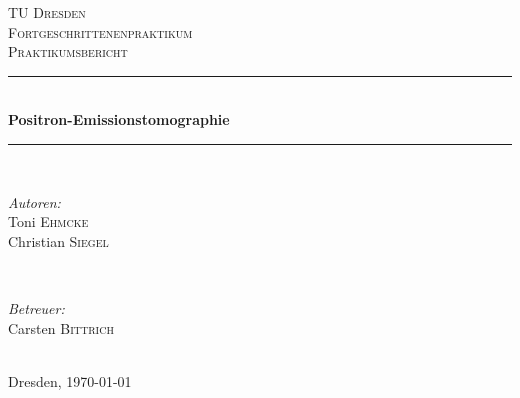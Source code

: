 \begin{titlepage}
\newcommand{\HRule}{\rule{\linewidth}{0.5mm}} %

\center %
 

\textsc{\LARGE TU Dresden}\\[1.5cm] %
\textsc{\Large Fortgeschrittenenpraktikum}\\[0.5cm] %
\textsc{\Large Praktikumsbericht}\\[0.5cm] %


\HRule \\[0.7cm]
{ \huge \bfseries Positron-Emissionstomographie}\\[0.4cm] %
\HRule \\[1.5cm]
 

\begin{minipage}{0.4\textwidth}
\begin{flushleft} \large
\emph{Autoren:}\\
Toni \textsc{Ehmcke}\\
Christian \textsc{Siegel}
\end{flushleft}
\end{minipage}
~
\begin{minipage}{0.4\textwidth}
\begin{flushright} \large
\emph{Betreuer:} \\
Carsten \textsc{Bittrich} %
\end{flushright}
\end{minipage}\\[4cm]


{\large Dresden, \today}\\[3cm] %

\vfill 

\end{titlepage}